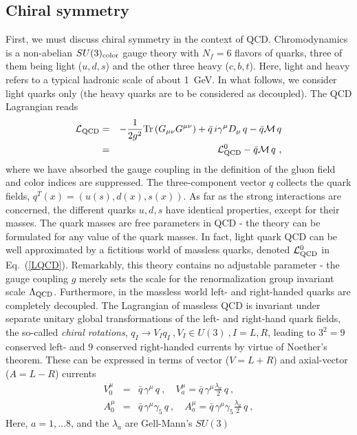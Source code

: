 \documentclass[aps,rmp,nofootinbib,twocolumn,floatfix]{revtex4}
\newcommand{\beqa}{\begin{eqnarray}}
\newcommand{\eeqa}{\end{eqnarray}}
\begin{document}
\subsection{Chiral symmetry}
\label{sec:chisym}
First, we must discuss chiral symmetry in the context of QCD. Chromodynamics is a
non-abelian $SU(3)_{\rm color}$ gauge theory with $N_f = 6$ flavors of quarks,
three of them being light ($u,d,s$) and the other three heavy ($c,b,t$).
Here, light and heavy refers to a typical hadronic scale of about 1~GeV.
In what follows, we consider light quarks only (the heavy quarks are to be 
considered as decoupled). The QCD Lagrangian reads
\beqa\label{LQCD}
{\mathcal L}_{\rm QCD} &=& -\frac{1}{2g^2} {\rm Tr} \left( G_{\mu\nu}G^{\mu\nu}
\right) + \bar q \, i \gamma^\mu D_\mu \, q -  \bar q {\mathcal M} \, q
\nonumber\\
&=&{\mathcal L}_{\rm QCD}^0  -  \bar q {\mathcal M} \, q   ~,
\eeqa
where we have absorbed the gauge coupling in the definition of the gluon
field and color indices are suppressed.  The three-component vector $q$
collects the quark fields, $q^T (x) = \left( u(s), d(x), s(x)\right)$. 
As far as the strong interactions
are concerned, the different quarks $u,d,s$ have identical properties, except
for their masses. The quark masses are free parameters in QCD - the theory
can be formulated for any value of the quark masses. In fact, light quark QCD
can be well approximated by a fictitious world of massless quarks,
denoted ${\mathcal L}_{\rm QCD}^0$ in Eq.~(\ref{LQCD}). Remarkably,
this theory contains no adjustable parameter - the gauge coupling $g$ merely
sets the scale for the renormalization group invariant scale $\Lambda_{\rm
  QCD}$. Furthermore, in the massless world left- and right-handed quarks
are completely decoupled. 
The Lagrangian of massless QCD is invariant under separate unitary
global transformations of the left- and right-hand quark fields, the
so-called {\em chiral rotations},
$q_I \to V_I q_I~,  V_I \in U(3)~,  I = L,R$,
leading to $3^2 =9$ conserved left- and $9$ conserved right-handed 
currents by virtue of Noether's theorem. These can be expressed in terms of 
vector ($V = L + R$) and  axial-vector ($A = L - R$) currents
\beqa\label{conscurr}
V_0^\mu &=& \bar q \, \gamma^\mu \, q~, \quad 
V^\mu_a = \bar q \, \gamma^\mu \frac{\lambda_a}{2} \, q~,\nonumber\\
A_0^\mu &=& \bar q \, \gamma^\mu \gamma_5 \, q~,\quad 
A^\mu_a = \bar q \, \gamma^\mu \gamma_5 \frac{\lambda_a}{2} \, q~,
\eeqa
Here, $a = 1, \ldots 8$, and the $\lambda_a$ are Gell-Mann's $SU(3)$
\end{document}
